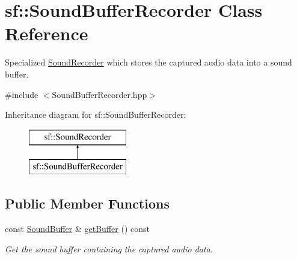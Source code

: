 \hypertarget{classsf_1_1SoundBufferRecorder}{\section{sf\-:\-:Sound\-Buffer\-Recorder Class Reference}
\label{classsf_1_1SoundBufferRecorder}
}


Specialized \hyperlink{classsf_1_1SoundRecorder}{Sound\-Recorder} which stores the captured audio data into a sound buffer.  




{\ttfamily \#include $<$Sound\-Buffer\-Recorder.\-hpp$>$}

Inheritance diagram for sf\-:\-:Sound\-Buffer\-Recorder\-:\begin{figure}[H]
\begin{center}
\leavevmode
\includegraphics[height=2.000000cm]{classsf_1_1SoundBufferRecorder}
\end{center}
\end{figure}
\subsection*{Public Member Functions}
\begin{DoxyCompactItemize}
\item 
const \hyperlink{classsf_1_1SoundBuffer}{Sound\-Buffer} \& \hyperlink{classsf_1_1SoundBufferRecorder_a84fd636ad22f434bafe2a7c15a8e5107}{get\-Buffer} () const 
\begin{DoxyCompactList}\small\item\em Get the sound buffer containing the captured audio data. \end{DoxyCompactList}\end{DoxyCompactItemize}
